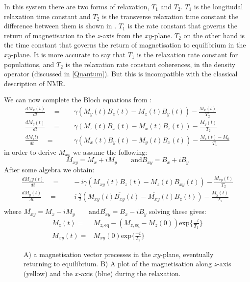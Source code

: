 In this system there are two forms of relaxation, $T_1$ and $T_2$. $T_1$ is the longitudal relaxation time
constant and $T_2$ is the transverse relaxation time constant the difference between them is shown in .
$T_1$ is the rate constant that governs the return of magnetisation to the $z$-axis from the $xy$-plane. $T_2$ on
the other hand is the time constant that governs the return of magnetisation to equilibrium in the $xy$-plane.
It is more accurate to say that $T_1$ is the relaxation rate constant for populations, and $T_2$ is the relaxation
rate constant coherences, in the density operator (discussed in \ref{Quantum}). But this is incompatible
with the classical description of NMR.

We can now complete the Bloch equations from :
\begin{align}
  \frac{dM_x(t)}{dt}\quad=&\quad\gamma(M_y(t)B_z(t)-M_z(t)B_y(t)) - \frac{M_x(t)}{T_2}\\
  \frac{dM_y(t)}{dt}\quad=&\quad\gamma(M_z(t)B_x(t)-M_x(t)B_z(t)) - \frac{M_y(t)}{T_2}\\
  \frac{dM_zt)}{dt}\quad=&\quad\gamma(M_x(t)B_y(t)-M_y(t)B_x(t)) - \frac{M_z(t)-M_0}{T_1}
\end{align}
in order to derive $M_{xy}$ we assume the following:
\begin{equation}
  M_{xy} = M_x + iM_y\qquad\text{and} B_{xy} = B_x + iB_y
\end{equation}
After some algebra we obtain:
\begin{align}
  \frac{dM_xy(t)}{dt}\quad=&\quad-i\gamma(M_{xy}(t)B_z(t)-M_z(t)B_{xy}(t)) - \frac{M_{xy}(t)}{T_2}\\
  \frac{dM_y(t)}{dt}\quad=&\quad~i~\frac{\gamma}{2}(M_{xy}(t)\overline{B_{xy}}(t)-\overline{M_{xy}}(t)B_z(t)) - \frac{M_y(t)}{T_2}\\
\end{align}
where $\overline{M_{xy}} = M_x - iM_y\qquad\text{and} \overline{B_{xy}} = B_x - iB_y$
solving these gives:
\begin{align}
  M_z(t) =& M_{z,\text{eq}} - (M_{z,\text{eq}}-M_z(0))\text{exp}\{\frac{-t}{T_1}\}\\
  M_{xy}(t) =& M_{xy}(0)\text{exp}\{\frac{-t}{T_2}\}
\end{align}

\begin{figure}
  \caption{A) a magnetisation vector precesses in the $xy$-plane, eventually returning to equilibrium.
  B) A plot of the magnetisation along $z$-axis (yellow) and the $x$-axis (blue) during the relaxation.}
  \label{fig:t1t2}
\end{figure}


